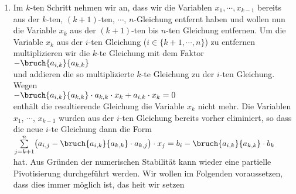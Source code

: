 \begin{enumerate}
      \textbf{Bemerkung}: An dieser Stelle fragen Sie sich vermutlich, was passiert, wenn
      $a_{1,1} = 0$ ist, denn dann ist der Ausdruck $\frac{a_{i,1}}{a_{1,1}}$ offenbar undefiniert.
      In so einem Fall vertauschen wir einfach die erste Gleichung mit einer anderen Gleichung,
      f\"{u}r die der Koeffizient der Variablen $x_1$ von $0$ verschieden ist.  In der Praxis hat es sich
      bew\"{a}hrt, immer die Gleichung als erste zu nehmen, f\"{u}r die der Koeffizient der Variablen $x_1$ den
      gr\"{o}\3ten Betrag hat, denn dadurch fallen die bei  einer numerischen Rechnung zwangsl\"{a}ufig
      auftretenden  Rundungsfehler weniger schwer ins Gewicht als wenn wir die
      Reihenfolge der Gleichungen beliebig w\"{a}hlen.   Diese Verfahren wird als
      \emph{partielle Pivotisierung} bezeichnet.
\item Im $k$-ten Schritt nehmen wir an, dass wir die Variablen $x_1, \cdots, x_{k-1}$ bereits aus 
      der $k$-ten, $(k+1)$-ten, $\cdots$, $n$-Gleichung entfernt haben und wollen nun die 
      Variable $x_k$ aus der $(k+1)$-ten bis $n$-ten Gleichung entfernen. 
      Um die Variable $x_k$ aus der $i$-ten Gleichung ($i \in \{ k+1,\cdots, n\}$)
      zu entfernen multiplizieren wir die $k$-te Gleichung mit dem Faktor
      \\[0.2cm]
      \hspace*{1.3cm}
      $-\bruch{a_{i,k}}{a_{k,k}}$
      \\[0.2cm]
      und addieren die so multiplizierte $k$-te Gleichung zu der $i$-ten Gleichung.  Wegen
      \\[0.2cm]
      \hspace*{1.3cm}
      $-\bruch{a_{i,k}}{a_{k,k}} \cdot a_{k,k} \cdot x_k + a_{i,k} \cdot x_k = 0$
      \\[0.2cm]
      enth\"{a}lt die resultierende Gleichung die Variable $x_k$ nicht mehr.  Die Variablen
      $x_1$, $\cdots$, $x_{k-1}$ wurden aus der $i$-ten Gleichung bereits vorher 
      eliminiert, so dass die neue $i$-te Gleichung
      dann die Form
      \\[0.2cm]
      \hspace*{1.3cm}
      $\sum\limits_{j=k+1}^n \bigl(a_{i,j} - \bruch{a_{i,k}}{a_{k,k}} \cdot a_{k,j}\bigr) \cdot x_j =
       b_{i} - \bruch{a_{i,k}}{a_{k,k}} \cdot b_{k}
      $
      \\[0.2cm]
      hat.   Aus Gr\"{u}nden der numerischen Stabilit\"{a}t kann wieder eine partielle Pivotisierung durchgef\"{u}hrt
      werden.  Wir wollen im Folgenden voraussetzen, dass dies immer m\"{o}glich ist, das hei\3t wir setzen

\end{enumerate}
